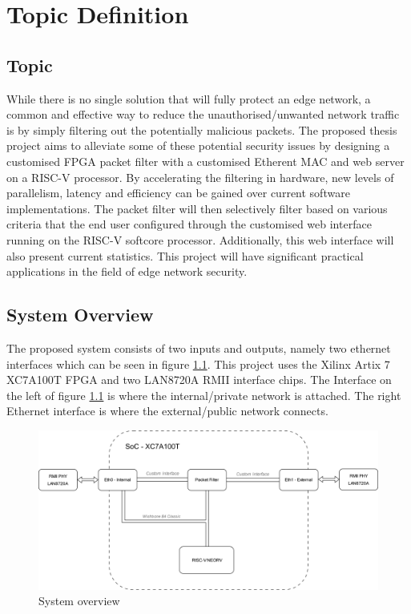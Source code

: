 \chapter[Topic Definition]{Topic Definition}
\label{Chap:label}	%
\pagestyle{headings}


\section{Topic}





While there is no single solution that will fully protect an edge network, a common and effective way to reduce the unauthorised/unwanted network 
traffic is by simply filtering out the potentially malicious packets. The proposed thesis project aims to alleviate some of these potential security issues by 
designing a customised FPGA packet filter with a customised Etherent MAC and web server on a RISC-V processor.  By accelerating the filtering in hardware, 
new levels of parallelism, latency and efficiency can be gained over current software implementations. The packet filter will then selectively filter based on various 
criteria that the end user configured through the customised web interface running on the RISC-V softcore processor. Additionally, this web interface will also 
present current statistics.  This project will have significant practical applications in the field of edge network security.


\section{System Overview}

The proposed system consists of two inputs and outputs, namely two ethernet interfaces which can be seen in figure \ref{fig:sys-overview}. This project uses the 
Xilinx Artix 7 XC7A100T FPGA and two LAN8720A RMII interface chips. The Interface on the left of figure \ref{fig:sys-overview} is where the internal/private 
network is attached. The right Ethernet interface is where the external/public network connects. 

\begin{figure}[h]
    \centering
    \includegraphics[width=1\textwidth]{Images/ThesisSystemsOverview.png}
    \caption{System overview}
    \label{fig:sys-overview}
\end{figure}

